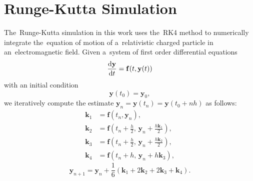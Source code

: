 	\section{Runge-Kutta Simulation}
	\label{sec:rks}
		The~Runge-Kutta simulation in this work uses the~\ac{RK4} method to numerically integrate the~equation of motion of a~relativistic charged particle in an~electromagnetic field. Given a~system of first order differential equations
			\begin{equation}
				\derivative{\mathbf{y}}{t}(t) = \mathbf{f}(t,\mathbf{y}(t))
			\end{equation}
		with an initial condition
			\begin{equation}
				\mathbf{y}(t_0) = \mathbf{y}_0,
			\end{equation}
		we iteratively compute the estimate $\mathbf{y}_n = \mathbf{y}(t_n) = \mathbf{y}(t_0+nh)$ as follows:
			\begin{align}
				\mathbf{k}_1 &= \mathbf{f}(t_n,\mathbf{y}_n),\\
				\mathbf{k}_2 &= \mathbf{f}\left(t_n+\frac{h}{2},\, \mathbf{y}_n+\frac{h\mathbf{k}_1}{2}\right),\\
				\mathbf{k}_3 &= \mathbf{f}\left(t_n+\frac{h}{2},\, \mathbf{y}_n+\frac{h\mathbf{k}_2}{2}\right),\\
				\mathbf{k}_4 &= \mathbf{f}(t_n+h,\, \mathbf{y}_n+h\mathbf{k}_3),
			\end{align}
			\begin{equation}
				\mathbf{y}_{n+1} = \mathbf{y}_n + \frac{1}{6}(\mathbf{k}_1+2\mathbf{k}_2+2\mathbf{k}_3+\mathbf{k}_4).
			\end{equation}
		
